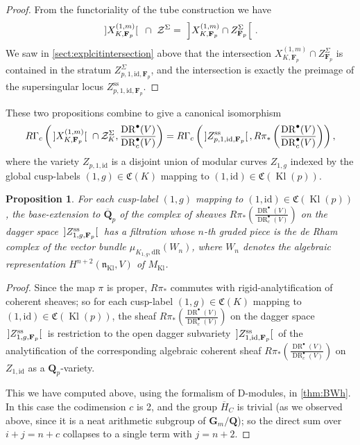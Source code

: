 \documentclass[cjm]{ipart}
\theoremstyle{plain}
\newtheorem{proposition}[theorem]{Proposition}
\theoremstyle{remark}
\DeclareMathOperator{\DR}{DR}
\DeclareMathOperator{\Kl}{Kl}
\DeclarePairedDelimiter{\tb}{{\,]}}{{[\, }} %
\newcommand{\Fp}{\mathbf{F}_p}
\newcommand{\QQbar}{\overline{\QQ}}
\newcommand{\QQ}{\mathbf{Q}}
\newcommand{\Qp}{\QQ_p}
\newcommand{\dR}{\mathrm{dR}}
\numberwithin{equation}{subsection}
\begin{document}
  \begin{proof}
   From the functoriality of the tube construction we have
   \[ \tb{X_{K, \Fp}^{(1, m)}}\ \cap\ \mathcal{Z}^\Sigma =\ 
     \Big] X_{K, \Fp}^{(1, m)}  \cap Z^{\Sigma}_{\Fp} \Big[\ .
   \]
   We saw in \cref{sect:explcitintersection} above that the intersection $X_{K, \Fp}^{(1, m)}  \cap Z^{\Sigma}_{\Fp}$ is contained in the stratum $Z^{\Sigma}_{p, 1, \mathrm{id}, \Fp}$, and the intersection is exactly the preimage of the supersingular locus $Z_{p, 1, \mathrm{id}, \Fp}^{\mathrm{ss}}$.
  \end{proof}
  
  These two propositions combine to give a canonical isomorphism
  \[ R\Gamma_{c}\left(\tb{X_{K, \Fp}^{(1, m)}}\, \cap \mathcal{Z}_K^{\Sigma}, \frac{\DR^\bullet(V)}{\DR^\bullet_c(V)}\right) = R\Gamma_{c}\left(\tb{Z_{p, 1, \mathrm{id}, \Fp}^{\mathrm{ss}}}, R\pi_* \left(\frac{\DR^\bullet(V)}{\DR^\bullet_c(V)}\right) \right), \]
  where the variety $Z_{p, 1, \mathrm{id}}$ is a disjoint union of modular curves $Z_{1, g}$ indexed by the global cusp-labels $(1, g) \in \mathfrak{C}(K)$ mapping to $(1, \mathrm{id}) \in \mathfrak{C}(\Kl(p))$.    
  

  \begin{proposition}
   For each cusp-label $(1, g)$ mapping to $(1, \mathrm{id}) \in \mathfrak{C}(\Kl(p))$, the base-extension to $\QQbar_p$ of the complex of sheaves $R\pi_*\left( \frac{\DR^\bullet(V)}{\DR^\bullet_c(V)}\right)$ on the dagger space $\tb{Z_{1, g, \Fp}^{\mathrm{ss}}}$ has a filtration whose $n$-th graded piece is the de Rham complex of the vector bundle $\mu_{K_{1, g}, \dR}\left(W_n\right)$, where $W_n$ denotes the algebraic representation $H^{n+2}(\mathfrak{n}_{\Kl}, V)$ of $M_{\Kl}$.
  \end{proposition}
  
  \begin{proof}
   Since the map $\pi$ is proper, $R\pi_*$ commutes with rigid-analytification of coherent sheaves; so for each cusp-label $(1, g) \in \mathfrak{C}(K)$ mapping to $(1, \mathrm{id}) \in \mathfrak{C}(\Kl(p))$, the sheaf $R\pi_*\left( \frac{\DR^\bullet(V)}{\DR^\bullet_c(V)}\right)$ on the dagger space $\tb{Z_{1, g, \Fp}^{\mathrm{ss}}}$ is restriction to the open dagger subvariety $\tb{Z_{1, \mathrm{id}, \Fp}^{\mathrm{ss}}}$ of the analytification of the corresponding algebraic coherent sheaf $R\pi_*\left( \frac{\DR^\bullet(V)}{\DR^\bullet_c(V)}\right)$ on $Z_{1, \mathrm{id}}$ as a $\Qp$-variety.
   
   This we have computed above, using the formalism of D-modules, in \cref{thm:BWh}. In this case the codimension $c$ is 2, and the group $\overline{H}_C$ is trivial (as we observed above, since it is a neat arithmetic subgroup of $\mathbf{G}_m / \QQ$); so the direct sum over $i + j = n + c$ collapses to a single term with $j = n + 2$.
  \end{proof}
  
\end{document}
